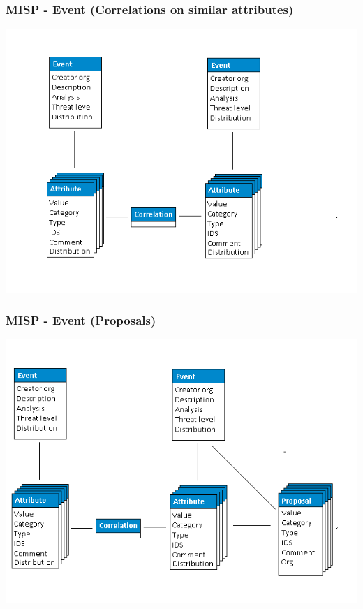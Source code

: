 \begin{frame}
    \frametitle{MISP - Event (Correlations on similar attributes)}
    \includegraphics[scale=0.45]{screenshots/datamodel3.png}
\end{frame}

\begin{frame}
    \frametitle{MISP - Event (Proposals)}
    \includegraphics[scale=0.45]{screenshots/datamodel4.png}
\end{frame}


